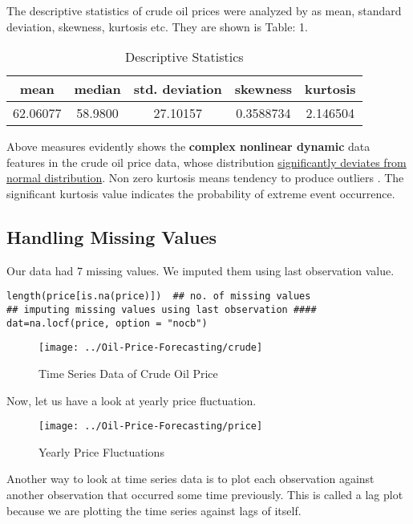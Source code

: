 \documentclass[11pt,a4paper]{article}
\begin{document}
The descriptive statistics of crude oil prices were analyzed by  as mean, standard deviation, skewness, kurtosis etc. They are shown is Table: 1.

	\begin{table}[h!]
	\begin{center}
\begin{tabular}{c c c c c }
	\hline
mean	& median & std. deviation  & skewness & kurtosis \\
	\hline
62.06077	& 58.9800 & 27.10157 & 0.3588734 & 2.146504\\
	\hline
\end{tabular}\end{center}
	\label{desc}
	\caption{Descriptive Statistics}
\end{table}


Above measures evidently shows the \textbf{complex nonlinear dynamic} data features in the crude oil price data, whose distribution \underline{significantly deviates from normal distribution}. 
Non zero kurtosis means tendency to produce outliers \cite{westfall2014kurtosis}. The significant kurtosis value indicates the probability of extreme event occurrence.



\subsection{Handling Missing Values} 
Our data had 7 missing values. We imputed them using last observation value. 
\begin{lstlisting}
length(price[is.na(price)])  ## no. of missing values
## imputing missing values using last observation ####
dat=na.locf(price, option = "nocb")
\end{lstlisting}


\begin{figure}[h!]
	\centering
	\texttt{[image: ../Oil-Price-Forecasting/crude]}
	\caption{Time Series Data of Crude Oil Price}
	\label{fig:crude}
\end{figure}
\pagebreak
Now, let us have a look at yearly price fluctuation.
\begin{figure}[h!]
	\centering
	\texttt{[image: ../Oil-Price-Forecasting/price]}
	\caption{Yearly Price Fluctuations}
	\label{fig:price}
\end{figure}

Another way to look at time series data is to plot each observation against another observation that occurred some time previously. This is called a lag plot because we are plotting the time series against lags of itself. 
\end{document}
